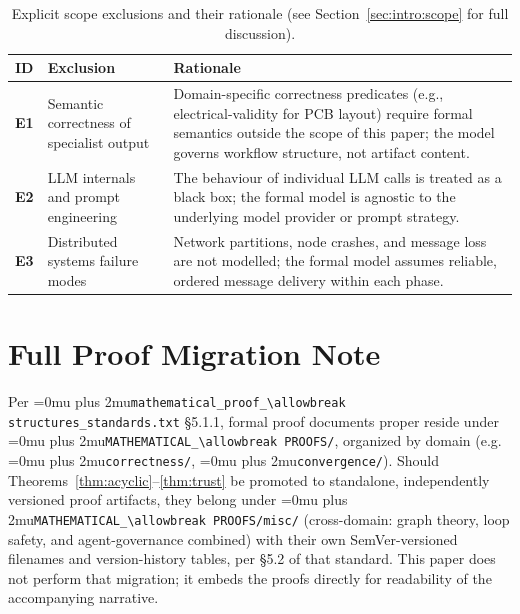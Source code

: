 \documentclass[12pt]{article}
\theoremstyle{definition}
\DeclareRobustCommand{\code}[1]{\begingroup\Urlmuskip=0mu plus 2mu\relax\nolinkurl{#1}\endgroup}
\newcommand{\ProofStd}{\code{mathematical\_proof\_\allowbreak structures\_standards.txt}}
\begin{document}
\begin{table}[H]
\centering
\caption{Explicit scope exclusions and their rationale
         (see Section~\ref{sec:intro:scope} for full discussion).}
\label{tab:exclusions}
\begin{tabularx}{\linewidth}{@{}>{\bfseries}p{1.0cm} >{\RaggedRight}p{3.2cm} X@{}}
\toprule
ID & Exclusion & Rationale \\
\midrule
E1 & Semantic correctness of specialist output &
  Domain-specific correctness predicates (e.g., electrical-validity
  for PCB layout) require formal semantics outside the scope of this
  paper; the model governs workflow structure, not artifact content. \\[4pt]
E2 & LLM internals and prompt engineering &
  The behaviour of individual LLM calls is treated as a black box;
  the formal model is agnostic to the underlying model provider or
  prompt strategy. \\[4pt]
E3 & Distributed systems failure modes &
  Network partitions, node crashes, and message loss are not modelled;
  the formal model assumes reliable, ordered message delivery within
  each phase. \\
\bottomrule
\end{tabularx}
\end{table}

\section{Full Proof Migration Note}
\label{app:migration}

\begin{sloppypar}
Per \ProofStd{} \S5.1.1, formal
proof documents proper reside under \code{MATHEMATICAL\_\allowbreak PROOFS/}, organized
by domain (e.g. \code{correctness/}, \code{convergence/}). Should
Theorems~\ref{thm:acyclic}--\ref{thm:trust} be promoted to standalone,
independently versioned proof artifacts, they belong under
\code{MATHEMATICAL\_\allowbreak PROOFS/misc/} (cross-domain: graph theory, loop safety,
and agent-governance combined) with their own SemVer-versioned filenames
and version-history tables, per \S5.2 of that standard. This paper does not
perform that migration; it embeds the proofs directly for readability of
the accompanying narrative.
\end{sloppypar}

\newpage
\end{document}
